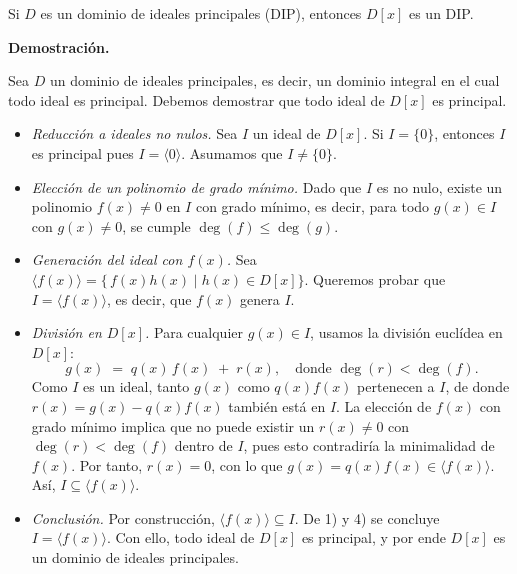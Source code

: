 Si $D$ es un dominio de ideales principales (DIP), entonces $D[x]$ es un DIP.

\textbf{Demostraci\'on.} 

Sea $D$ un dominio de ideales principales, es decir, un dominio integral en el cual todo ideal es principal. Debemos demostrar que todo ideal de $D[x]$ es principal.


\begin{itemize}
    \item\textit{Reducci\'on a ideales no nulos.}  
    Sea $I$ un ideal de $D[x]$. Si $I = \{0\}$, entonces $I$ es principal pues $I = \langle 0 \rangle$. Asumamos que $I \neq \{0\}$.

    \item \textit{Elecci\'on de un polinomio de grado m\'inimo.}  
    Dado que $I$ es no nulo, existe un polinomio $f(x)\neq 0$ en $I$ con grado m\'inimo, es decir, para todo $g(x) \in I$ con $g(x)\neq 0$, se cumple $\deg(f)\leq \deg(g)$.

    \item \textit{Generaci\'on del ideal con $f(x)$.}  
    Sea $\langle f(x)\rangle = \{\,f(x)h(x)\mid h(x)\in D[x]\}$. Queremos probar que $I=\langle f(x)\rangle$, es decir, que $f(x)$ genera $I$.

    \item \textit{Divisi\'on en $D[x]$.}  
    Para cualquier $g(x)\in I$, usamos la divisi\'on eucl\'idea en $D[x]$:  
    \[
    g(x) \;=\; q(x)\,f(x)\;+\; r(x),
    \quad\text{donde } \deg(r)<\deg(f).
    \]
    Como $I$ es un ideal, tanto $g(x)$ como $q(x)f(x)$ pertenecen a $I$, de donde $r(x) = g(x) - q(x)f(x)$ tambi\'en est\'a en $I$.  
    La elecci\'on de $f(x)$ con grado m\'inimo implica que no puede existir un $r(x)\neq 0$ con $\deg(r)<\deg(f)$ dentro de $I$, pues esto contradir\'ia la minimalidad de $f(x)$. Por tanto, $r(x)=0$, con lo que $g(x)=q(x)f(x)\in \langle f(x)\rangle$. As\'i, $I\subseteq \langle f(x)\rangle$.

    \item \textit{Conclusi\'on.}  
    Por construcci\'on, $\langle f(x)\rangle\subseteq I$. De 1) y 4) se concluye $I=\langle f(x)\rangle$. Con ello, todo ideal de $D[x]$ es principal, y por ende $D[x]$ es un dominio de ideales principales.
\end{itemize}
